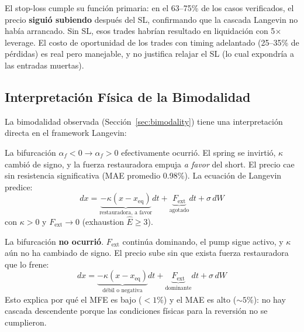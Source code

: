 \documentclass[11pt,a4paper]{article}
\newcommand{\af}{\alpha_f}
\newcommand{\exh}{\hat{E}}
\begin{document}
\begin{tcolorbox}[infobox, title=Conclusi\'on del An\'alisis Post-SL]
El stop-loss cumple su funci\'on primaria: en el 63--75\% de los casos
verificados, el precio \textbf{sigui\'o subiendo} despu\'es del SL,
confirmando que la cascada Langevin no hab\'ia arrancado. Sin SL,
esos trades habr\'ian resultado en liquidaci\'on con 5$\times$ leverage.
El costo de oportunidad de los trades con timing adelantado (25--35\%
de p\'erdidas) es real pero manejable, y no justifica relajar el SL
(lo cual expondr\'ia a las entradas muertas).
\end{tcolorbox}


\subsection{Interpretaci\'on F\'isica de la Bimodalidad}
\label{sec:physical_interpretation}

La bimodalidad observada (Secci\'on~\ref{sec:bimodality}) tiene una
interpretaci\'on directa en el framework Langevin:

\begin{description}[leftmargin=1.5em]
\item[Winners (E-ratio = 4.35):] La bifurcaci\'on $\af < 0 \to \af > 0$
  efectivamente ocurri\'o. El spring se invirti\'o, $\kappa$ cambi\'o de
  signo, y la fuerza restauradora empuja \textit{a favor} del short.
  El precio cae sin resistencia significativa (MAE promedio 0.98\%).
  La ecuaci\'on de Langevin predice:
  \begin{equation}
  dx = \underbrace{-\kappa(x - x_{\text{eq}})}_{\text{restauradora, a favor}} dt
    + \underbrace{F_{\text{ext}}}_{\text{agotado}} dt + \sigma\, dW
  \end{equation}
  con $\kappa > 0$ y $F_{\text{ext}} \to 0$ (exhaustion $\exh \geq 3$).

\item[Losers (E-ratio = 0.49):] La bifurcaci\'on \textbf{no ocurri\'o}.
  $F_{\text{ext}}$ contin\'ua dominando, el pump sigue activo, y
  $\kappa$ a\'un no ha cambiado de signo. El precio sube sin que
  exista fuerza restauradora que lo frene:
  \begin{equation}
  dx = \underbrace{-\kappa(x - x_{\text{eq}})}_{\text{d\'ebil o negativa}} dt
    + \underbrace{F_{\text{ext}}}_{\text{dominante}} dt + \sigma\, dW
  \end{equation}
  Esto explica por qu\'e el MFE es bajo ($< 1\%$) y el MAE es alto
  ($\sim 5\%$): no hay cascada descendente porque las condiciones
  f\'isicas para la reversi\'on no se cumplieron.
\end{description}
\end{document}

